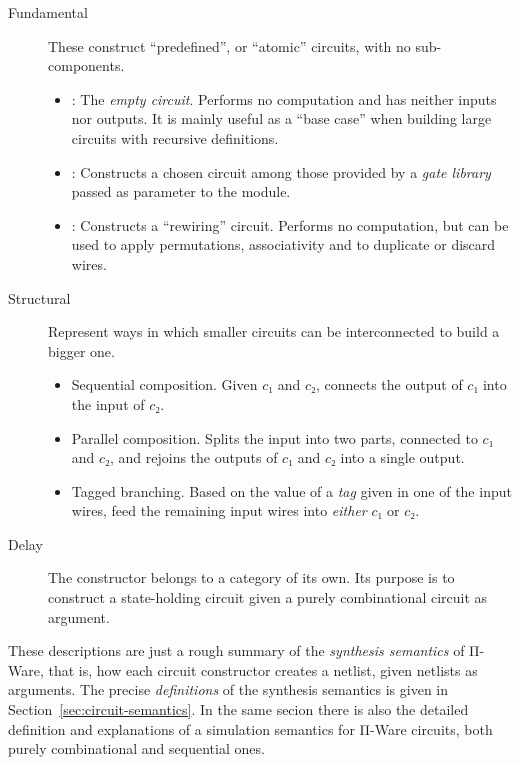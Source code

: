         \begin{description}
            \item[Fundamental] These construct ``predefined'', or ``atomic'' circuits, with no sub-components.
                \begin{itemize}
                    \item {}: The \emph{empty circuit}. Performs no computation and has neither inputs nor outputs.
                        It is mainly useful as a ``base case'' when building large circuits with recursive definitions.
                    \item {}: Constructs a chosen circuit among those provided by a \emph{gate library}
                        passed as parameter to the  module.
                    \item {}: Constructs a ``rewiring'' circuit. Performs no computation,
                        but can be used to apply permutations, associativity and to duplicate or discard wires.
                \end{itemize}
            \item[Structural] Represent ways in which smaller circuits can be interconnected to build a bigger one.
                \begin{itemize}
                    \item {} Sequential composition.
                        Given $c₁$ and $c₂$, connects the output of $c₁$ into the input of $c₂$.
                    \item {} Parallel composition.
                        Splits the input into two parts, connected to $c₁$ and $c₂$,
                        and rejoins the outputs of $c₁$ and $c₂$ into a single output.
                    \item {} Tagged branching.
                        Based on the value of a \emph{tag} given in one of the input wires,
                        feed the remaining input wires into \emph{either} $c₁$ or $c₂$.
                \end{itemize}
            \item[Delay]
                The  constructor belongs to a category of its own.
                Its purpose is to construct a state-holding circuit given a purely combinational circuit as argument.
        \end{description}

        These descriptions are just a rough summary of the \emph{synthesis semantics} of Π-Ware, that is,
        how each circuit constructor creates a netlist, given netlists as arguments.
        The precise \emph{definitions} of the synthesis semantics is given in Section~\ref{sec:circuit-semantics}.
        In the same secion there is also the detailed definition and explanations of a simulation semantics
        for Π-Ware circuits, both purely combinational and sequential ones.

